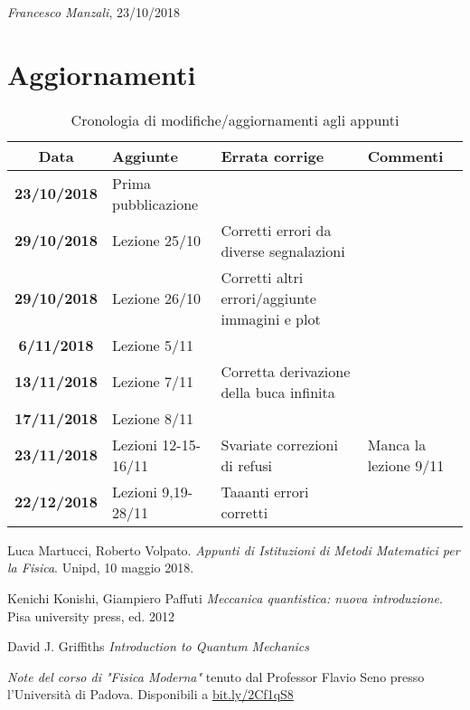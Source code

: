 \documentclass[12pt]{report}
\begin{document}
\begin{flushright}
\textit{Francesco Manzali}, 23/10/2018
\end{flushright}
\clearpage
\section*{Aggiornamenti}
\begin{table}[hb]
    \centering
    \begin{tabular}{|cm{3cm}m{5cm}m{3cm}|}\toprule
        Data & Aggiunte & Errata corrige & Commenti\\\midrule
        \textbf{23/10/2018} & Prima pubblicazione & & \\
        \textbf{29/10/2018} & Lezione 25/10 & Corretti errori da diverse segnalazioni & \\
        \textbf{29/10/2018} & Lezione 26/10 & Corretti altri errori/aggiunte immagini e plot & \\
        \textbf{6/11/2018} & Lezione 5/11 & &\\
        \textbf{13/11/2018} & Lezione 7/11 & Corretta derivazione della buca infinita &\\
        \textbf{17/11/2018} & Lezione 8/11 & &\\
        \textbf{23/11/2018} & Lezioni 12-15-16/11 & Svariate correzioni di refusi & Manca la lezione 9/11\\
        \textbf{22/12/2018} & Lezioni 9,19-28/11 & Taaanti errori corretti & \\
        \bottomrule
    \end{tabular}
    \caption{Cronologia di modifiche/aggiornamenti agli appunti}
    \label{updates}
\end{table}

\clearpage






\clearpage
\begin{thebibliography}{9}

Luca Martucci, Roberto Volpato.
\textit{Appunti di Istituzioni di Metodi Matematici per la Fisica}. 
Unipd, 10 maggio 2018.
 
Kenichi Konishi, Giampiero Paffuti
\textit{Meccanica quantistica: nuova introduzione}.
Pisa university press, ed. 2012

David J. Griffiths
\textit{Introduction to Quantum Mechanics}

\textit{Note del corso di "Fisica Moderna"} tenuto dal Professor Flavio Seno presso l'Università di Padova.
Disponibili a \url{bit.ly/2Cf1qS8}
\end{thebibliography}

\printindex
\end{document}
